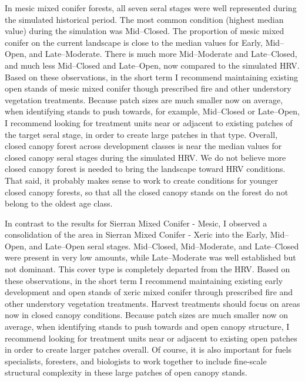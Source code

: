 In mesic mixed conifer forests, all seven seral stages were well represented during the simulated historical period. The most common condition (highest median value) during the simulation was Mid--Closed. The proportion of mesic mixed conifer on the current landscape is close to the median values for Early, Mid--Open, and Late--Moderate. There is much more Mid--Moderate and Late--Closed, and much less Mid--Closed and Late--Open, now compared to the simulated HRV. Based on these observations, in the short term I recommend maintaining existing open stands of mesic mixed conifer though prescribed fire and other understory vegetation treatments. Because patch sizes are much smaller now on average, when identifying stands to push towards, for example, Mid--Closed or Late--Open, I recommend looking for treatment units near or adjacent to existing patches of the target seral stage, in order to create large patches in that type. Overall, closed canopy forest across development classes is near the median values for closed canopy seral stages during the simulated HRV. We do not believe more closed canopy forest is needed to bring the landscape toward HRV conditions. That said, it probably makes sense to work to create conditions for younger closed canopy forests, so that all the closed canopy stands on the forest do not belong to the oldest age class.

In contrast to the results for Sierran Mixed Conifer - Mesic, I observed a consolidation of the area in Sierran Mixed Conifer - Xeric into the Early, Mid--Open, and Late--Open seral stages. Mid--Closed, Mid--Moderate, and Late--Closed were present in very low amounts, while Late--Moderate was well established but not dominant. This cover type is completely departed from the HRV. Based on these observations, in the short term I recommend maintaining existing early development and open stands of xeric mixed conifer through prescribed fire and other understory vegetation treatments. Harvest treatments should focus on areas now in closed canopy conditions. Because patch sizes are much smaller now on average, when identifying stands to push towards and open canopy structure, I recommend looking for treatment units near or adjacent to existing open patches in order to create larger patches overall. Of course, it is also important for fuels specialists, foresters, and biologists to work together to include fine-scale structural complexity in these large patches of open canopy stands.
 
